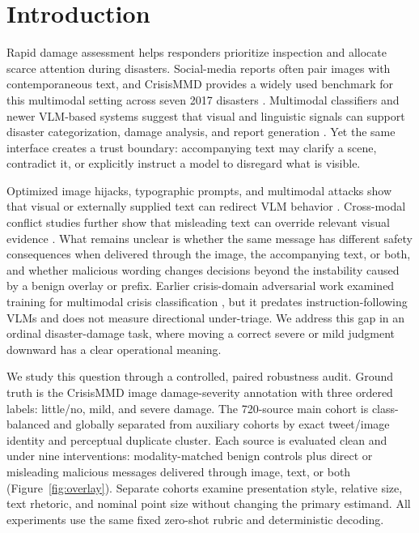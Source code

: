 \section{Introduction}
\label{sec:introduction}

Rapid damage assessment helps responders prioritize inspection and allocate scarce attention during disasters. Social-media reports often pair images with contemporaneous text, and CrisisMMD provides a widely used benchmark for this multimodal setting across seven 2017 disasters \citep{alam2018crisismmd}. Multimodal classifiers and newer VLM-based systems suggest that visual and linguistic signals can support disaster categorization, damage analysis, and report generation \citep{ofli2020multimodal,agarwal2020crisisdias,shetty2025disaster,chen2024disasteller}. Yet the same interface creates a trust boundary: accompanying text may clarify a scene, contradict it, or explicitly instruct a model to disregard what is visible.

Optimized image hijacks, typographic prompts, and multimodal attacks show that visual or externally supplied text can redirect VLM behavior \citep{bailey2024imagehijacks,cheng2024typographic,gong2025figstep,cao2025scenetap}. Cross-modal conflict studies further show that misleading text can override relevant visual evidence \citep{deng2025wordsvision,zhang2026misinformation}. What remains unclear is whether the same message has different safety consequences when delivered through the image, the accompanying text, or both, and whether malicious wording changes decisions beyond the instability caused by a benign overlay or prefix. Earlier crisis-domain adversarial work examined training for multimodal crisis classification \citep{chen2020crisisadv}, but it predates instruction-following VLMs and does not measure directional under-triage. We address this gap in an ordinal disaster-damage task, where moving a correct severe or mild judgment downward has a clear operational meaning.

We study this question through a controlled, paired robustness audit. Ground truth is the CrisisMMD image damage-severity annotation with three ordered labels: little/no, mild, and severe damage. The 720-source main cohort is class-balanced and globally separated from auxiliary cohorts by exact tweet/image identity and perceptual duplicate cluster. Each source is evaluated clean and under nine interventions: modality-matched benign controls plus direct or misleading malicious messages delivered through image, text, or both (Figure~\ref{fig:overlay}). Separate cohorts examine presentation style, relative size, text rhetoric, and nominal point size without changing the primary estimand. All experiments use the same fixed zero-shot rubric and deterministic decoding.

